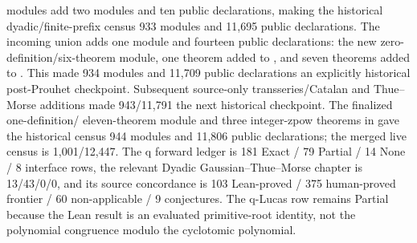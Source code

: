 \documentclass[11pt]{article}
\theoremstyle{remark}
\begin{document}
 modules add two modules and ten
public declarations, making the historical dyadic/finite-prefix census 933
modules and 11,695 public declarations.  The incoming union adds one module
and fourteen public declarations: the new zero-definition/six-theorem
 module, one theorem added to
, and seven theorems added to
.  This made 934 modules and 11,709
public declarations an explicitly historical post-Prouhet checkpoint.
Subsequent source-only transseries/Catalan and Thue--Morse additions made
943/11,791 the next historical checkpoint.  The finalized one-definition/
eleven-theorem  module and three integer-zpow
theorems in  gave the historical census 944
modules and 11,806 public declarations; the merged live census is 1,001/12,447.  The q forward ledger is 181 Exact /
79 Partial / 14 None / 8 interface rows, the relevant Dyadic
Gaussian--Thue--Morse chapter is 13/43/0/0, and its source concordance is
103 Lean-proved / 375 human-proved frontier / 60 non-applicable / 9 conjectures.
The q-Lucas row remains Partial because the Lean result is an evaluated
primitive-root identity, not the polynomial congruence modulo the cyclotomic
polynomial.
\end{document}
